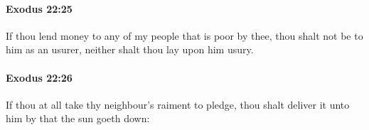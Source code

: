 		\paragraph{Exodus 22:25} %
			\label{EXODUS-22-25}

			If thou lend money to any of my people that is poor by thee, thou shalt not be to him as an usurer, neither shalt thou lay upon him usury.


		\paragraph{Exodus 22:26} %
			\label{EXODUS-22-26}

			If thou at all take thy neighbour's raiment to pledge, thou shalt deliver it unto him by that the sun goeth down:


